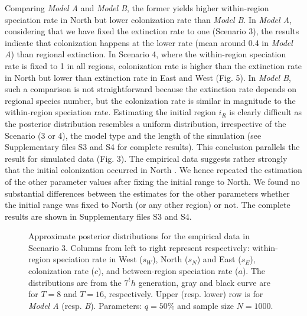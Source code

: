 Comparing \textit{Model A} and \textit{Model B}, the former yields higher within-region speciation rate in North but lower colonization rate than \textit{Model B}. 
In \textit{Model A}, considering that we have fixed the extinction rate to one (Scenario 3), the results indicate that colonization happens at the lower rate (mean around 0.4 in \textit{Model A}) than regional extinction.
In Scenario 4, where the within-region speciation rate is fixed to 1 in all regions, colonization rate is higher than the extinction rate in North but lower than extinction rate in East and West (Fig. 5). 
In \textit{Model B}, such a comparison is not straightforward because the extinction rate depends on regional species number, but the colonization rate is similar in magnitude to the within-region speciation rate.
Estimating the initial region $i_R$  is clearly difficult as the posterior distribution resembles a uniform distribution, irrespective of the Scenario (3 or 4), the model type and the length of the simulation (see Supplementary files S3 and S4 for complete results). 
This conclusion parallels the result for simulated data (Fig. 3). 
The empirical data suggests rather strongly that the initial colonization occurred in North \citep{Miraldo2014}. We hence repeated the estimation of the other parameter values after fixing the initial range to North. We found no substantial differences between the estimates for the other parameters whether the initial range was fixed to North (or any other region) or not. The complete results are shown in Supplementary files S3 and S4.   
%
\begin{figure*}[t]
\begin{center}
\caption{Approximate posterior distributions for the empirical data in Scenario 3. 
	Columns from left to right represent respectively: within-region speciation rate in West ($s_W$), North ($s_N$) and East ($s_E$), colonization rate ($c$), and between-region speciation rate ($a$).
	The distributions are from the $7^th$ generation, gray and black curve are for $T = 8$ and $T = 16$, respectively. 
	Upper (resp. lower) row is for \textit{Model A} (resp. \textit{B}). 
	Parameters: $q = 50\%$ and sample size $N = 1000$. }
\label{fig:6}
\vspace{-0.2in}
\end{center}
\end{figure*}
